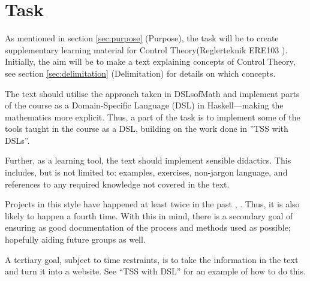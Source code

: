 \section{Task}
As mentioned in section \ref{sec:purpose} (Purpose), the task will be to create supplementary learning material for Control Theory(Reglerteknik ERE103 \cite{ERE103}). 
Initially, the aim will be to make a text explaining concepts of Control Theory, see section \ref{sec:delimitation} (Delimitation) for details on which concepts. 

The text should utilise the approach taken in DSLsofMath\cite{DAT326} and implement parts of the course as a Domain-Specific Language (DSL) in Haskell---making the mathematics more explicit. Thus, a part of the task is to implement some of the tools taught in the course as a DSL, building on the work done in ''TSS with DSLs''\cite{tssarbete}.

Further, as a learning tool, the text should implement sensible didactics. This includes, but is not limited to: examples, exercises, non-jargon language, and references to any required knowledge not covered in the text.

Projects in this style have happened at least twice in the past \cite{tssarbete}, \cite{fysikarbete}. Thus, it is also likely to happen a fourth time. With this in mind, there is a secondary goal of ensuring as good documentation of the process and methods used as possible; hopefully aiding future groups as well.

A tertiary goal, subject to time restraints, is to take the information in the text and turn it into a website. See ``TSS with DSL''\cite{tssarbete} for an example of how to do this. 











\iffalse
Problem/Uppgift: (slides)

Analysen identifierar frågorna eller uppgiften som ska tas upp i projektet. 

Viktigt att göra en problemanalys eller uppgiftsanalys även om handledaren och/eller företaget redan har specificerat ett/en problem/uppgift. 

Det ”verkliga” primära problemet/uppgiften skiljer sig ofta från det som föreslagits i början av uppdragsgivaren. 

Problemanalysen syftar också till att bryta ner problemet/uppgiften i mindre och mer detaljerade delproblem/deluppgifter, vilket också leder till formulering av delsyften. 

En bra analys som identifierar delsyften vilar på användning av teorier och modeller från litteraturen.
\fi